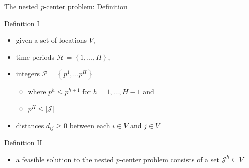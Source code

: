 \documentclass[utf8,aspectratio=169,ngerman,english]{beamer}
\begin{document}
\begin{frame}{The nested \textit{p}-center problem: Definition}
    \begin{minipage}{0.48\textwidth}
        \begin{block}{Definition I}
            \vspace*{2pt}
            \begin{itemize}
                \item given a set of locations $V$, \pause
                \item time periods $\mathcal H = \left \{1,\dots,H \right \}$, \pause
                \item integers $\mathcal P = \left \{p^1, \dots p^H \right \}$   \pause
                      \begin{itemize}
                          \item where $p^h \leq p^{h+1}$ for $h = 1, \dots, H-1$ and
                          \item $p^H \leq \left\lvert \mathcal J \right\rvert$
                      \end{itemize} \pause
                \item distances $d_{ij} \geq 0$ between each $i \in V$ and $j \in V$ \pause
            \end{itemize}
            \vspace*{2pt}
        \end{block}
    \end{minipage}
    \begin{minipage}{0.48\textwidth}
        \begin{block}{Definition II}
            \begin{itemize}
                \item a feasible solution to the nested $p$-center problem consists of a set $\mathcal J^h \subseteq V$ \pause

\end{itemize}
\end{block}
\end{minipage}
\end{frame}
\end{document}
